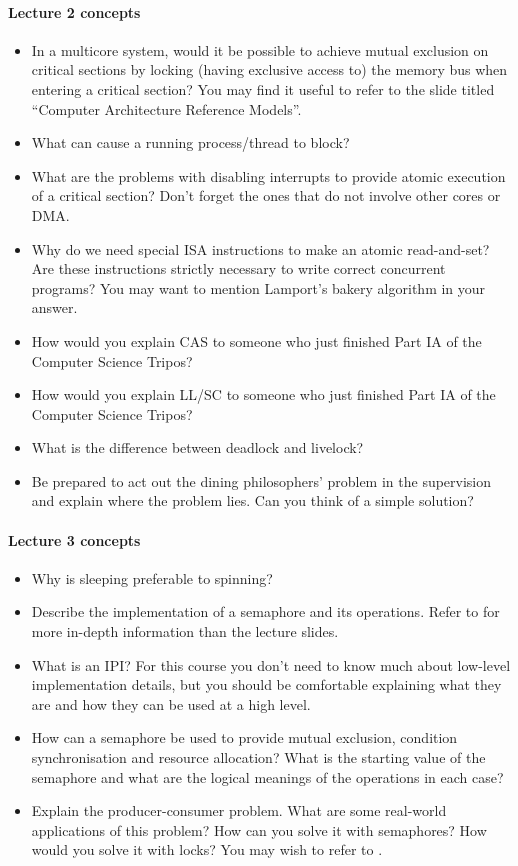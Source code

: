 \documentclass[12pt,a4paper,oneside,openright]{report}
\newcommand{\question}[2]{\paragraph{#1} #2}
\begin{document}
\question{Lecture 2 concepts}{
  \begin{itemize}
  \item In a multicore system, would it be possible to achieve mutual
    exclusion on critical sections by locking (having exclusive access
    to) the memory bus when entering a critical section? You may find
    it useful to refer to the slide titled ``Computer Architecture
    Reference Models''.
  \item What can cause a running process/thread to block?
  \item What are the problems with disabling interrupts to provide
    atomic execution of a critical section? Don't forget the ones that
    do not involve other cores or DMA.
  \item Why do we need special ISA instructions to make an atomic
    read-and-set? Are these instructions strictly necessary to write
    correct concurrent programs? You may want to mention Lamport's
    bakery algorithm in your answer.
  \item How would you explain CAS to someone who just finished Part IA
    of the Computer Science Tripos?
  \item How would you explain LL/SC to someone who just finished Part
    IA of the Computer Science Tripos?
  \item What is the difference between deadlock and livelock?
  \item Be prepared to act out the dining philosophers' problem in the
    supervision and explain where the problem lies. Can you think of a
    simple solution?
  \end{itemize}
}

\question{Lecture 3 concepts}{
  \begin{itemize}
  \item Why is sleeping preferable to spinning?
  \item Describe the implementation of a semaphore and its
    operations. Refer to
    \cite[Chapters~10.4--10.6]{bacon2003operating} for more in-depth
    information than the lecture slides.
  \item What is an IPI? For this course you don't need to know much
    about low-level implementation details, but you should be
    comfortable explaining what they are and how they can be used at a
    high level.
  \item How can a semaphore be used to provide mutual exclusion,
    condition synchronisation and resource allocation? What is the
    starting value of the semaphore and what are the logical meanings
    of the operations in each case?
  \item Explain the producer-consumer problem. What are some
    real-world applications of this problem? How can you solve it with
    semaphores? How would you solve it with locks? You may wish to
    refer to \cite[Chapter~11.3]{bacon2003operating}.
  \end{itemize}
}
\end{document}
